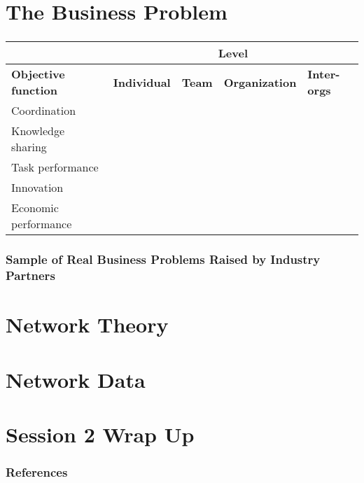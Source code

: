 \documentclass[notes, aspectratio=1610]{beamer}
\begin{document}
\section{The Business Problem}

\begin{frame}
	\frametitle{}
	\begin{table}
		\begin{small}
			\begin{center}
				\begin{tabular}[c]{
					|l|p{2cm}|p{2cm}|p{2cm}|p{2cm}|
					}
					\hline
					\textbf{}
					& \multicolumn{4}{c|}{\textbf{Level}}\\
					\hline
					\textbf{Objective function}
					& \textbf{Individual}
					& \textbf{Team}
					& \textbf{Organization}
					& \textbf{Inter-orgs}\\
					\hline
					Coordination\dotfill
					& 
					&
					&
					&\\ 
					Knowledge sharing\dotfill
					&
					&
					&
					&\\
					Task performance\dotfill
					&
					&
					&
					&\\ 
					Innovation\dotfill
					&
					&
					&
					&\\ 
				        Economic performance\dotfill
					&
					&
					&
					&\\
					\hline
				\end{tabular}
			\end{center}
		\end{small}
	\end{table}
	
\end{frame}

\begin{frame}
	\frametitle{Sample of Real Business Problems Raised by Industry Partners}
\end{frame}

\section{Network Theory}

\section{Network Data}

\section{Session 2 Wrap Up}


\begin{frame}
	\frametitle{References}
	\printbibliography
 \end{frame} 
\end{document}
